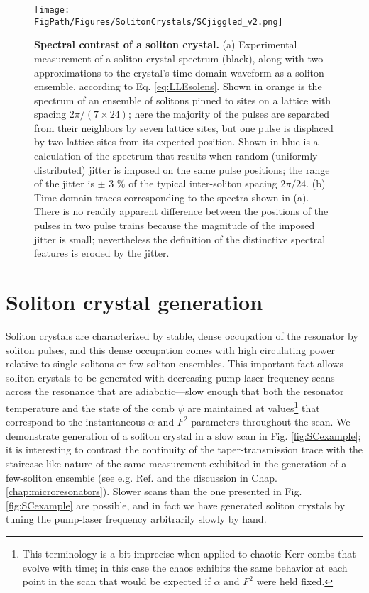\begin{figure}[htpb]
	\begin{center}
		\texttt{[image: \\FigPath/Figures/SolitonCrystals/SCjiggled\_v2.png]}
	\end{center}
	\caption[Spectral contrast of a soliton crystal]{\textbf{Spectral contrast of a soliton crystal.} (a) Experimental measurement of a soliton-crystal spectrum (black), along with two approximations to the crystal's time-domain waveform as a soliton ensemble, according to Eq. \ref{eq:LLEsolens}. Shown in orange is the spectrum of an ensemble of solitons pinned to sites on a lattice with spacing $2\pi/(7\times24)$; here the majority of the pulses are separated from their neighbors by seven lattice sites, but one pulse is displaced by two lattice sites from its expected position. Shown in blue is a calculation of the spectrum that results when random (uniformly distributed) jitter is imposed on the same pulse positions; the range of the jitter is $\pm$ 3 $\%$ of the typical inter-soliton spacing $2\pi/24$. (b) Time-domain traces corresponding to the spectra shown in (a). There is no readily apparent difference between the positions of the pulses in two pulse trains because the magnitude of the imposed jitter is small; nevertheless the definition of the distinctive spectral features is eroded by the jitter.}
	\label{fig:SCjiggled}
\end{figure} 

\section{Soliton crystal generation}

Soliton crystals are characterized by stable, dense occupation of the resonator by soliton pulses, and this dense occupation comes with high circulating power relative to single solitons or few-soliton ensembles. This important fact allows soliton crystals to be generated with decreasing pump-laser frequency scans across the resonance that are adiabatic---slow enough that both the resonator temperature and the state of the comb $\psi$ are maintained at values\footnote{This terminology is a bit imprecise when applied to chaotic Kerr-combs that evolve with time; in this case the chaos exhibits the same behavior at each point in the scan that would be expected if $\alpha$ and $F^2$ were held fixed.} that correspond to the instantaneous $\alpha$ and $F^2$ parameters throughout the scan. We demonstrate generation of a soliton crystal in a slow scan in Fig. \ref{fig:SCexample}; it is interesting to contrast the continuity of the taper-transmission trace with the staircase-like nature of the same measurement exhibited in the generation of a few-soliton ensemble (see e.g. Ref. \cite{Herr2014} and the discussion in Chap. \ref{chap:microresonators}). Slower scans than the one presented in Fig. \ref{fig:SCexample} are possible, and in fact we have generated soliton crystals by tuning the pump-laser frequency arbitrarily slowly by hand.


